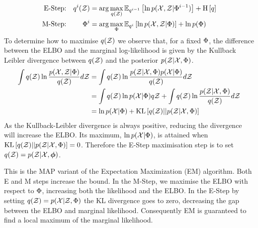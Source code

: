 \begin{align}
\text{E-Step:} & & q^i(\zdat) & = \arg \max_{q(\zdat)} \ex{\ln p(\xdat, \zdat|\params^{i-1})}{q^{i-1}} + \ent{q} \label{eqn:estep} \\
\text{M-Step:} & & \params^i & = \arg \max_{\params} \ex{\ln \joint}{q^{i}} + \ln p(\params) \label{eqn:mstep}
\end{align}
To determine how to maximise $q(\zdat)$ we observe that, for a fixed $\params$, the difference between the ELBO and the marginal log-likelihood is given by
 the Kullback Leibler divergence between $q(\zdat)$ and the posterior $p(\zdat|\xdat, \params)$.
\begin{align}
\int q(\zdat) \ln \frac{p(\xdat, \zdat|\params)}{q(\zdat)} d\zdat
& = \int q(\zdat) \ln \frac{p(\zdat|\xdat, \params)p(\xdat | \params)}{q(\zdat)} d\zdat \\
& = \int q(\zdat) \ln p(\xdat | \params) q\zdat + \int q(\zdat)\ln\frac{p(\zdat|\xdat, \params)}{q(\zdat)} d\zdat \\
& = \ln p(\xdat | \params) + \kl{q(\zdat)}{p(\zdat|\xdat, \params)}
\end{align}
As the Kullback-Leibler divergence is always positive, reducing the divergence will increase the ELBO. Its maximum, $\ln p(\xdat | \params)$, is attained when $\kl{q(\zdat)}{p(\zdat|\xdat, \params)} = 0$. Therefore the  E-Step maximisation step is to set $q(\zdat) = p(\zdat | \xdat, \param)$.

This is the MAP variant of the Expectation Maximization (EM) algorithm\cite{Dempster1977}. 
Both E and M steps increase the bound. In the M-Step, we maximise the ELBO with respect to $\params$, increasing both the likelihood and the ELBO. In the E-Step by setting $q(\zdat) = p(\xdat|\zdat, \params)$ the KL divergence goes to zero, decreasing the gap between the ELBO and marginal likelihood. Consequently EM is guaranteed to find a local maximum of the marginal likelihood.

